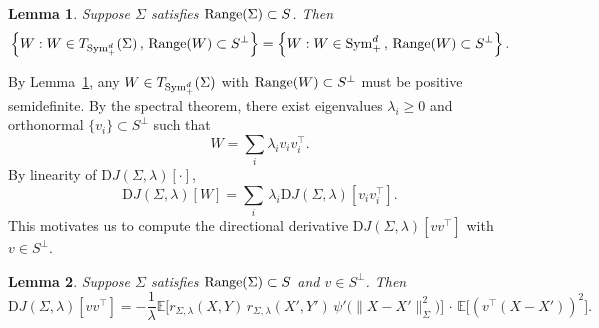 \documentclass[sn-mathphys-num]{sn-jnl}%
\numberwithin{equation}{section}
\newcommand{\E}{\mathbb{E}}
\newtheorem{lemma}{Lemma}
\newcommand{\Range}{{\rm Range}}
\newcommand{\Sym}{{\rm \mathrm{Sym}}}
\theoremstyle{thmstyleone}%
\theoremstyle{thmstyletwo}%
\theoremstyle{thmstylethree}%
\begin{document}
\vspace{.5em}
\begin{lemma}
\label{lemma:basic-convex-geometry}
Suppose $\Sigma$ satisfies $\Range(\Sigma) \subset S$. Then 
\begin{equation*}
	\left\{W: W \in T_{\Sym_+^d}(\Sigma) \, , \, \Range(W)\subset S^\perp\right\}
		= \left\{W: W \in \Sym_+^d \, , \, \Range(W)\subset S^\perp\right\}.
\end{equation*}
\end{lemma} 
By Lemma~\ref{lemma:basic-convex-geometry}, any $W\in T_{\Sym_+^d}(\Sigma)$ with $\Range(W)\subset S^\perp$
must be positive semidefinite. 
By the spectral theorem, there exist eigenvalues $\lambda_i\ge 0$ and orthonormal $\{v_i\} \subset S^\perp$ such that
\begin{equation}
  W = \sum_i \lambda_i v_i v_i^\top.
\end{equation} 
By linearity of $\mathrm{D} J(\Sigma,\lambda)[\cdot]$,
\begin{equation}
\label{eqn:W-into-rank-one-perturbations}
  \mathrm{D} J(\Sigma,\lambda)[W]
  = \sum_i \,\lambda_i \mathrm{D} J(\Sigma,\lambda)[v_i v_i^\top].
\end{equation}
This motivates us to compute the directional derivative $\mathrm{D} J(\Sigma, \lambda)[vv^\top]$ with $v \in S^\perp$.
\vspace{.5em} 
\begin{lemma}
\label{lemma:factorization-lemma}
Suppose $\Sigma$ satisfies $\Range(\Sigma)\subset S$ and $v\in S^\perp$. Then 
\begin{equation}
\label{eqn:factorization-formula}
	\mathrm{D} J(\Sigma, \lambda)[vv^\top] = -
		\frac{1}{\lambda} \E\bigl[
      r_{\Sigma,\lambda}(X, Y)\,
      r_{\Sigma,\lambda}(X', Y')\,
      \psi'\bigl(\|X-X'\|_{\Sigma}^2\bigr)
    \bigr]\, \cdot \,
    \E\bigl[(v^\top (X-X'))^2\bigr].
\end{equation} 
\end{lemma} 
\end{document}
